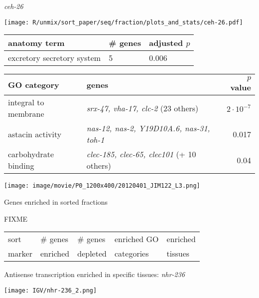 \documentclass[serif,9pt]{beamer}
\begin{document}
\begin{frame}{{\em ceh-26}}

\begin{minipage}{0.4\textwidth}
\texttt{[image: R/unmix/sort\_paper/seq/fraction/plots\_and\_stats/ceh-26.pdf]}
\end{minipage}
\begin{minipage}{0.58\textwidth}
\begin{table}[!tbp]\scriptsize
\begin{tabular}{lll}
anatomy term & \# genes & adjusted $p$ \\
\hline
excretory secretory system & 5 & 0.006 \\
\end{tabular}
\end{table}
\end{minipage}

\begin{table}\footnotesize
\begin{tabular}{llr}
GO category & genes & $p$ value \\
\hline
integral to membrane & {\em srx-47, vha-17, clc-2} (23 others) & $2 \cdot 10^{-7}$ \\
astacin activity & {\em nas-12, nas-2, Y19D10A.6, nas-31, toh-1} & 0.017 \\
carbohydrate binding & {\em clec-185, clec-65, clec101} (+ 10 others) & 0.04 \\
\end{tabular}
\end{table}

\texttt{[image: image/movie/P0\_1200x400/20120401\_JIM122\_L3.png]}

\end{frame}

\begin{frame}{Genes enriched in sorted fractions}

FIXME

\begin{table}\footnotesize
\begin{tabular}{lllll}
sort & \# genes & \# genes & enriched GO & enriched \\
marker & enriched & depleted & categories & tissues \\
\hline
\end{tabular}
\end{table}

\end{frame}

\begin{frame}{Antisense transcription enriched in specific tissues: {\em nhr-236}}

\texttt{[image: IGV/nhr-236\_2.png]}

\end{frame}
\end{document}
